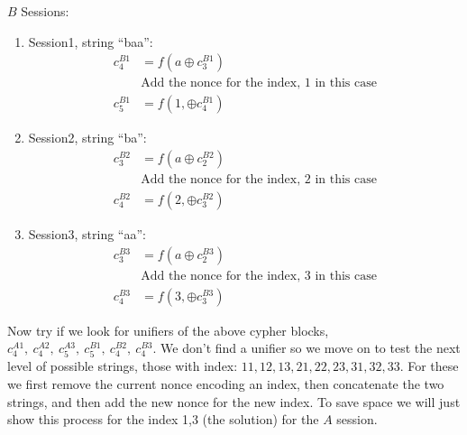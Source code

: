 \documentclass{llncs}
\begin{document}
\begin{example}
	\noindent
	$B$ Sessions:
\begin{enumerate}
	\item Session1, string ``baa'':
	\begin{align*}
	c^{B1}_4 &= f(a \oplus c^{B1}_3)\\
		&\text{Add the nonce for the index, 1 in this case}\\
		c^{B1}_5 &=f(1, \oplus c^{B1}_4)
	\end{align*}
	\item Session2, string ``ba'':
	\begin{align*}
	c^{B2}_3 &= f(a \oplus c^{B2}_2)\\
		&\text{Add the nonce for the index, 2 in this case}\\
		c^{B2}_4 &=f(2, \oplus c^{B2}_3)
	\end{align*}
	\item Session3, string ``aa'':
	\begin{align*}
	c^{B3}_3 &= f(a \oplus c^{B3}_2)\\
		&\text{Add the nonce for the index, 3 in this case}\\
		c^{B3}_4 &=f(3, \oplus c^{B3}_3)
	\end{align*}
\end{enumerate}
 
Now try if we look for unifiers of the above cypher blocks, 
$c^{A1}_4, ~c^{A2}_4, ~c^{A3}_5, ~c^{B1}_5, ~c^{B2}_4, ~c^{B3}_4$.
We don't find a unifier so we move on to test the next level of
possible strings, those with index: $11, 12, 13, 21, 22, 23, 31, 32, 33$. For these we first remove the current nonce encoding an index, 
then concatenate the two strings, and then add the new nonce for the
new index.  To save space we will just show this process for 
the index 1,3 (the solution) for the $A$ session.


\end{example}
\end{document}
